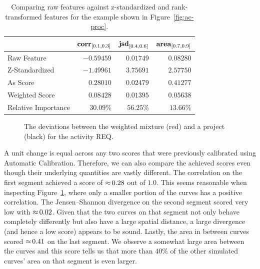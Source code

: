 \begin{table}[t!]
    \centering
    \begin{tabular}{l|r|r|r}
            & $\operatorname{\mathbf{corr}}_{\interval{0.1}{0.3}}$ & $\operatorname{\mathbf{jsd}}_{\interval{0.4}{0.6}}$ & $\operatorname{\mathbf{area}}_{\interval{0.7}{0.9}}$ \\ \hline
        Raw Feature     & $-0.59459$    & $0.01749$  & $0.08280$ \\
        Z-Standardized  & $-1.49961$    & $3.75691$  & $2.57750$ \\
        As Score        & $0.28010$     & $0.02479$  & $0.41277$ \\
        Weighted Score  & $0.08428$     & $0.01395$  & $0.05638$ \\ \hline
        Relative Importance & $30.09$\% & $56.25$\% & $13.66$\% \\
    \end{tabular}
    \caption[Comparison of raw features against z-standardized and rank-transformed features.]{{\small Comparing raw features against z-standardized and rank-transformed features for the example shown in Figure~\ref{fig:ac-proc}.}}
    \label{tab:ac-raw-vs-scores}
\end{table}


\begin{figure}[t!]
    \centering
    \makebox[\textwidth][c]{}
    \caption[Three different deviations between two continuous software processes.]{{\small The deviations between the weighted mixture (red) and a project (black) for the activity \textsf{REQ}.}}
    \label{fig:ac-raw-vs-scores}
\end{figure}


A unit change is equal across any two scores that were previously calibrated using Automatic Calibration.
Therefore, we can also compare the achieved scores even though their underlying quantities are vastly different.
The correlation on the first segment achieved a score of ${\approx}\,0.28$ out of $1.0$.
This seems reasonable when inspecting Figure~\ref{fig:ac-raw-vs-scores}, where only a smaller portion of the curves has a positive correlation.
The Jensen--Shannon divergence on the second segment scored very low with ${\approx}\,0.02$.
Given that the two curves on that segment not only behave completely differently but also have a large spatial distance, a large divergence (and hence a low score) appears to be sound.
Lastly, the area in between curves scored ${\approx}\,0.41$ on the last segment.
We observe a somewhat large area between the curves and this score tells us that more than $40$\% of the other simulated curves' area on that segment is even larger.


